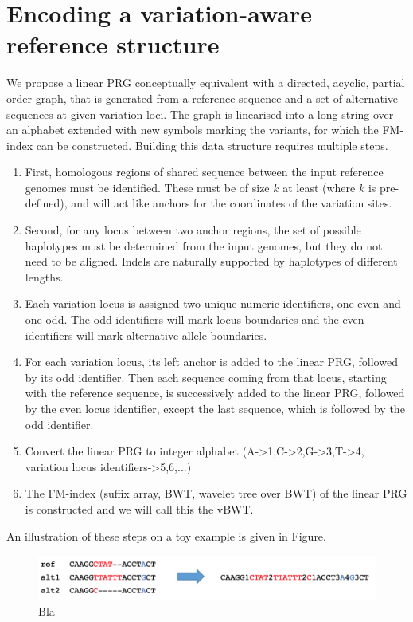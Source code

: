 \documentclass[runningheads,a4paper]{llncs}
\begin{document}
\section{Encoding a variation-aware reference structure}

We propose a linear PRG conceptually equivalent with a directed, acyclic, partial order graph, that is generated from a reference sequence and a set of alternative sequences at given variation loci. The graph is linearised into a long string over an alphabet extended with new symbols marking the variants, for which the FM-index can be constructed. Building this data structure requires multiple steps. 
\begin{enumerate}
\item First, homologous regions of shared sequence between the input reference genomes must be identified. These must be of size $k$ at least (where $k$ is pre-defined), and will act like anchors for the coordinates of the variation sites. 
\item Second, for any locus between two anchor regions, the set of possible haplotypes must be determined from the input genomes, but they do not need to be aligned. Indels are naturally supported by haplotypes of different lengths.
\item Each variation locus is assigned two unique numeric identifiers, one even and one odd. The odd identifiers will mark locus boundaries and the even identifiers will mark alternative allele boundaries.
\item For each variation locus, its left anchor is added to the linear PRG, followed by its odd identifier. Then each sequence coming from that locus, starting with the reference sequence, is successively added to the linear PRG, followed by the even locus identifier, except the last sequence, which is followed by the odd identifier.
\item Convert the linear PRG to integer alphabet (A->1,C->2,G->3,T->4, variation locus identifiers->5,6,...)
\item The FM-index (suffix array, BWT, wavelet tree over BWT) of the linear PRG is constructed and we will call this the vBWT.
\end{enumerate}

An illustration of these steps on a toy example is given in Figure.

\begin{figure}
\centering
\includegraphics[height=1.5cm]{linPRG}
\caption{Bla}
\label{fig:example}
\end{figure}
\end{document}
